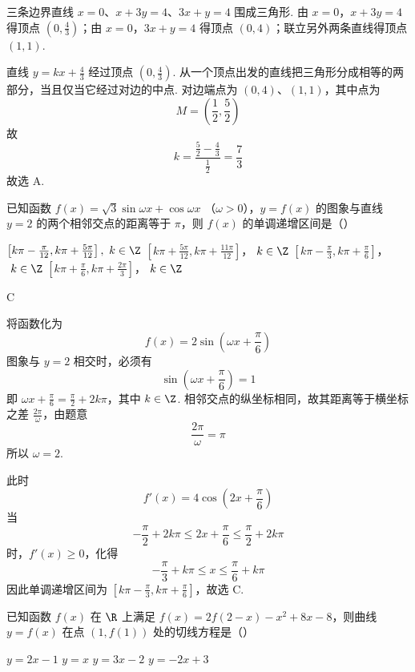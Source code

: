 \begin{solution}
三条边界直线 \(x=0\)、\(x+3y=4\)、\(3x+y=4\) 围成三角形. 由
\(x=0\)，\(x+3y=4\)
得顶点 \(\left(0,\frac{4}{3}\right)\)；由
\(x=0\)，\(3x+y=4\)
得顶点 \((0,4)\)；联立另外两条直线得顶点 \((1,1)\).

直线 \(y=kx+\frac{4}{3}\) 经过顶点 \(\left(0,\frac{4}{3}\right)\). 从一个顶点出发的直线把三角形分成相等的两部分，当且仅当它经过对边的中点. 对边端点为 \((0,4)\)、\((1,1)\)，其中点为
\[
M=\left(\frac{1}{2},\frac{5}{2}\right)
\]
故
\[
k=\frac{\frac{5}{2}-\frac{4}{3}}{\frac{1}{2}}=\frac{7}{3}
\]
故选 A.
\end{solution}

\begin{problem}
已知函数 \(f(x) = \sqrt{3}\sin \omega x + \cos \omega x\) （\(\omega > 0\)），\(y = f(x)\) 的图象与直线 \(y = 2\) 的两个相邻交点的距离等于 \(\pi\)，则 \(f(x)\) 的单调递增区间是（\quad）

\choices
    {\(\left[k\pi - \frac{\pi}{12}, k\pi + \frac{5\pi}{12}\right],\ k\in \Z\)}
    {\(\left[k\pi + \frac{5\pi}{12}, k\pi + \frac{11\pi}{12}\right]\)，\(\ k\in \Z\)}
    {\(\left[k\pi - \frac{\pi}{3}, k\pi + \frac{\pi}{6}\right]\)，\(\ k\in \Z\)}
    {\(\left[k\pi + \frac{\pi}{6}, k\pi + \frac{2\pi}{3}\right]\)，\(\ k\in \Z\)}
\end{problem}

\begin{answer}
C
\end{answer}

\begin{solution}
将函数化为
\[
f(x)=2\sin\left(\omega x+\frac{\pi}{6}\right)
\]
图象与 \(y=2\) 相交时，必须有
\[
\sin\left(\omega x+\frac{\pi}{6}\right)=1
\]
即 \(\omega x+\frac{\pi}{6}=\frac{\pi}{2}+2k\pi\)，其中 \(k\in\Z\). 相邻交点的纵坐标相同，故其距离等于横坐标之差 \(\frac{2\pi}{\omega}\)，由题意
\[
\frac{2\pi}{\omega}=\pi
\]
所以 \(\omega=2\).

此时
\[
f'(x)=4\cos\left(2x+\frac{\pi}{6}\right)
\]
当
\[
-\frac{\pi}{2}+2k\pi\leqslant 2x+\frac{\pi}{6}\leqslant\frac{\pi}{2}+2k\pi
\]
时，\(f'(x)\geqslant0\)，化得
\[
-\frac{\pi}{3}+k\pi\leqslant x\leqslant\frac{\pi}{6}+k\pi
\]
因此单调递增区间为 \(\left[k\pi-\frac{\pi}{3},k\pi+\frac{\pi}{6}\right]\)，故选 C.
\end{solution}

\begin{problem}
已知函数 \(f(x)\) 在 \(\R\) 上满足 \(f(x) = 2f(2 - x) - x^2 + 8x - 8\)，则曲线 \(y = f(x)\) 在点 \((1, f(1))\) 处的切线方程是（\quad）

\choices
    {\(y = 2x - 1\)}
    {\(y = x\)}
    {\(y = 3x - 2\)}
    {\(y = -2x + 3\)}
\end{problem}

